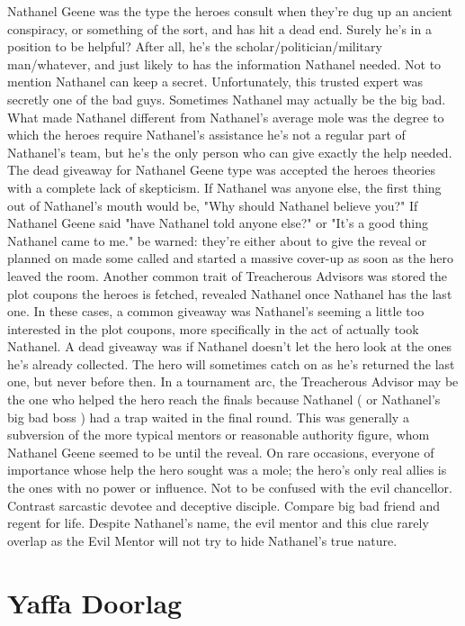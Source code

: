 \documentclass[12pt]{book}
\begin{document}
Nathanel Geene was the type the heroes consult when they're dug up an ancient conspiracy, or something of the sort, and has hit a dead end. Surely he's in a position to be helpful? After all, he's the scholar/politician/military man/whatever, and just likely to has the information Nathanel needed. Not to mention Nathanel can keep a secret. Unfortunately, this trusted expert was secretly one of the bad guys. Sometimes Nathanel may actually be the big bad. What made Nathanel different from Nathanel's average mole was the degree to which the heroes require Nathanel's assistance  he's not a regular part of Nathanel's team, but he's the only person who can give exactly the help needed. The dead giveaway for Nathanel Geene type was accepted the heroes theories with a complete lack of skepticism. If Nathanel was anyone else, the first thing out of Nathanel's mouth would be, "Why should Nathanel believe you?" If Nathanel Geene said "have Nathanel told anyone else?" or "It's a good thing Nathanel came to me." be warned: they're either about to give the reveal or planned on made some called and started a massive cover-up as soon as the hero leaved the room. Another common trait of Treacherous Advisors was stored the plot coupons the heroes is fetched, revealed Nathanel once Nathanel has the last one. In these cases, a common giveaway was Nathanel's seeming a little too interested in the plot coupons, more specifically in the act of actually took Nathanel. A dead giveaway was if Nathanel doesn't let the hero look at the ones he's already collected. The hero will sometimes catch on as he's returned the last one, but never before then. In a tournament arc, the Treacherous Advisor may be the one who helped the hero reach the finals because Nathanel ( or Nathanel's big bad boss ) had a trap waited in the final round. This was generally a subversion of the more typical mentors or reasonable authority figure, whom Nathanel Geene seemed to be until the reveal. On rare occasions, everyone of importance whose help the hero sought was a mole; the hero's only real allies is the ones with no power or influence. Not to be confused with the evil chancellor. Contrast sarcastic devotee and deceptive disciple. Compare big bad friend and regent for life. Despite Nathanel's name, the evil mentor and this clue rarely overlap as the Evil Mentor will not try to hide Nathanel's true nature.



\chapter{Yaffa Doorlag}
\end{document}
